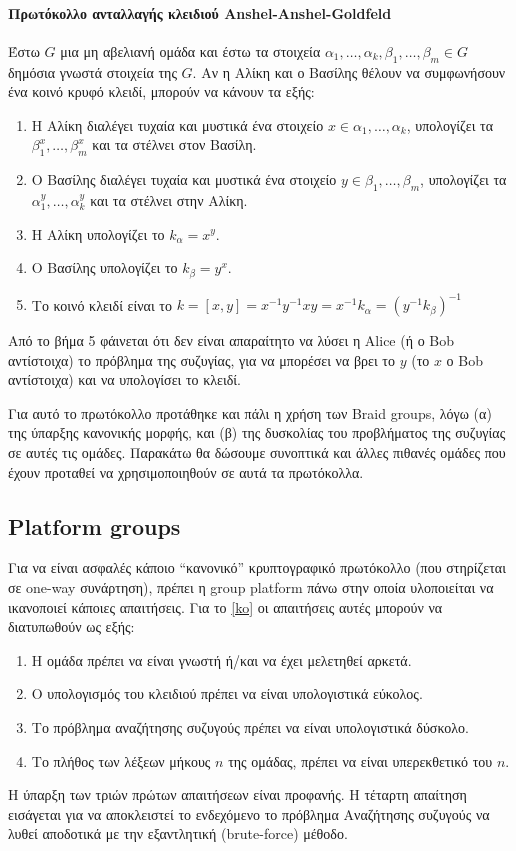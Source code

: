 \paragraph*{Πρωτόκολλο ανταλλαγής κλειδιού Anshel-Anshel-Goldfeld \cite{Anshel99analgebraic}} Έστω $ G $ μια μη αβελιανή ομάδα και έστω τα στοιχεία $ \alpha_1, \dots, \alpha_k,\beta_1, \dots, \beta_m \in G $ δημόσια γνωστά στοιχεία της $ G $. Αν η Αλίκη και ο Βασίλης θέλουν να συμφωνήσουν ένα κοινό κρυφό κλειδί, μπορούν να κάνουν τα εξής:
\begin{enumerate}
\item Η Αλίκη διαλέγει τυχαία και μυστικά ένα στοιχείο $ x \in \alpha_1, \dots, \alpha_k $, υπολογίζει τα $ \beta_1^x, \dots, \beta_m^x $ και τα στέλνει στον Βασίλη.
\item Ο Βασίλης διαλέγει τυχαία και μυστικά ένα στοιχείο $ y \in \beta_1, \dots, \beta_m $, υπολογίζει τα $ \alpha_1^y, \dots, \alpha_k^y $ και τα στέλνει στην Αλίκη.
\item Η Αλίκη υπολογίζει το $ k_\alpha = x^y $.
\item Ο Βασίλης υπολογίζει το $k_\beta= y^x$.
\item Το κοινό κλειδί είναι το $ k =[x,y] = x^{-1}y^{-1} xy  
= x^{-1}k_\alpha = \left( y^{-1} k_\beta \right)^{-1} $ \label{key}
\end{enumerate}

Από το βήμα 5 φάινεται ότι δεν είναι απαραίτητο να λύσει η Alice (ή ο Bob αντίστοιχα) το πρόβλημα της συζυγίας, για να μπορέσει να βρει το $y$ (το $x$ ο Bob αντίστοιχα) και να υπολογίσει το κλειδί.

Για αυτό το πρωτόκολλο προτάθηκε και πάλι η χρήση των Braid groups, λόγω (α) της ύπαρξης κανονικής μορφής, και (β) της δυσκολίας του προβλήματος της συζυγίας σε αυτές τις ομάδες. Παρακάτω θα δώσουμε συνοπτικά και άλλες πιθανές ομάδες που έχουν προταθεί να χρησιμοποιηθούν σε αυτά τα πρωτόκολλα.


\subsection{Platform groups}

Για να είναι ασφαλές κάποιο ``κανονικό'' κρυπτογραφικό πρωτόκολλο (που στηρίζεται σε one-way συνάρτηση), πρέπει η group platform πάνω στην οποία υλοποιείται να ικανοποιεί κάποιες απαιτήσεις. Για το \ref{ko} οι απαιτήσεις αυτές μπορούν να διατυπωθούν ως εξής:
\begin{enumerate}
\item Η ομάδα πρέπει να είναι γνωστή ή/και να έχει μελετηθεί αρκετά.
\item Ο υπολογισμός του κλειδιού πρέπει να είναι υπολογιστικά εύκολος.
\item Το πρόβλημα αναζήτησης συζυγούς πρέπει να είναι υπολογιστικά δύσκολο.
\item Το πλήθος των λέξεων μήκους $ n $ της ομάδας, πρέπει να είναι υπερεκθετικό του $ n $. 
\end{enumerate}
Η ύπαρξη των τριών πρώτων απαιτήσεων είναι προφανής. Η τέταρτη απαίτηση εισάγεται για να αποκλειστεί το ενδεχόμενο το πρόβλημα Αναζήτησης συζυγούς να λυθεί αποδοτικά με την εξαντλητική (brute-force) μέθοδο.

